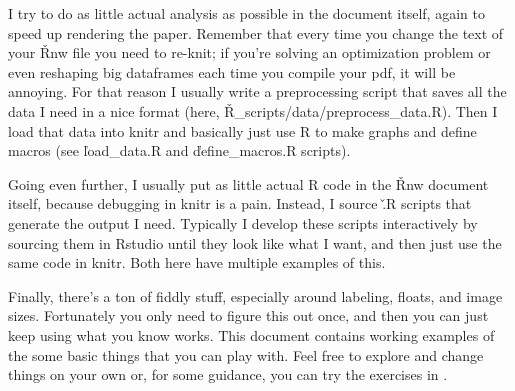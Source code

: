 I try to do as little actual analysis as possible in the document itself, again
to speed up rendering the paper.  Remember that every time you change the text
of your \v{Rnw} file you need to re-knit; if you're solving an optimization
problem or even reshaping big dataframes each time you compile your pdf, it will
be annoying.  For that reason I usually write a preprocessing script that saves
all the data I need in a nice format (here,
\v{R\_scripts/data/preprocess\_data.R}).  Then I load that data into knitr and
basically just use R to make graphs and define macros (see \v{load\_data.R}
and \v{define\_macros.R} scripts).

Going even further, I usually put as little actual R code in the \v{Rnw}
document itself, because debugging in knitr is a pain.  Instead, I source \v{.R}
scripts that generate the output I need.  Typically I develop these scripts
interactively by sourcing them in Rstudio until they look like what I want, and
then just use the same code in knitr.  Both  here have multiple examples of this.

Finally, there's a ton of fiddly stuff, especially around labeling, floats,
and image sizes.  Fortunately you only need to figure this out once, and then
you can just keep using what you know works.  This document contains working
examples of the some basic things that you can play with.  Feel free to
explore and change things on your own or, for some guidance, you can try
the exercises in .
